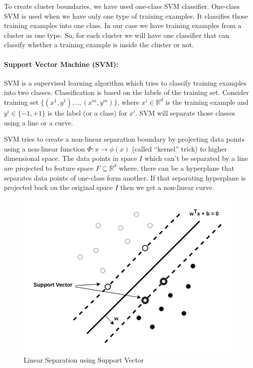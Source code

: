 \documentclass[12pt,oneside,a4paper]{article}
\begin{document}
To create cluster boundaries, we have used one-class SVM classifier. One-class SVM is used when we have only one type of training examples. It classifies those training examples into one class. In our case we have training examples from a cluster as one type. So, for each cluster we will have one classifier that can classify whether a training example is inside the cluster or not.

\paragraph{Support Vector Machine (SVM):}

SVM is a supervised learning algorithm which tries to classify training examples into two classes. Classification is based on the labels of the training set.
Consider training set $\{(x^{1},y^{1}), .., (x^{m},y^{m})\}$, where $x^{i} \in \mathbb{R}^d$ is the training example and $y^{i} \in \{-1, +1\}$ is the label (or a class) for $x^{i}$. SVM will separate those classes using a line or a curve.

SVM tries to create a non-linear separation boundary by projecting data points using a non-linear function $\Phi:x \rightarrow \phi(x)$ (called ``kernel'' trick) to higher dimensional space. The data points in space $I$ which can't be separated by a line are projected to feature space $F \subseteq \mathbb{R}^d$ where, there can be a hyperplane that separates data points of one-class form another. If that separating hyperplane is projected back on the original space $I$ then we get a non-linear curve.\cite{svm}

\begin{figure}[H]
\centering
\includegraphics[scale=0.5]{SVM.png}
\caption{Linear Separation using Support Vector} \label{fig:SVM}
\end{figure}
\end{document}
